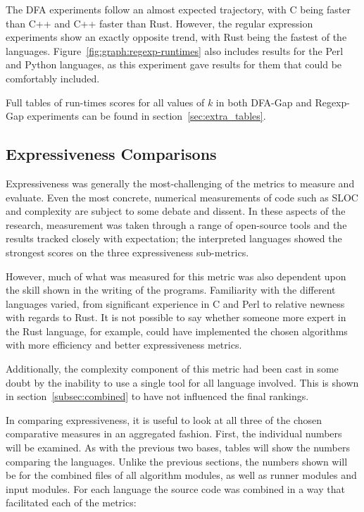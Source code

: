 The DFA experiments follow an almost expected trajectory, with C being faster than C++ and C++ faster than Rust. However, the regular expression experiments show an exactly opposite trend, with Rust being the fastest of the languages. Figure~\ref{fig:graph:regexp-runtimes} also includes results for the Perl and Python languages, as this experiment gave results for them that could be comfortably included.

Full tables of run-times scores for all values of $k$ in both DFA-Gap and Regexp-Gap experiments can be found in section~\ref{sec:extra_tables}.

\subsection{Expressiveness Comparisons}
\label{subsec:expr_comp}

Expressiveness was generally the most-challenging of the metrics to measure and evaluate. Even the most concrete, numerical measurements of code such as SLOC and complexity are subject to some debate and dissent. In these aspects of the research, measurement was taken through a range of open-source tools and the results tracked closely with expectation; the interpreted languages showed the strongest scores on the three expressiveness sub-metrics.

However, much of what was measured for this metric was also dependent upon the skill shown in the writing of the programs. Familiarity with the different languages varied, from significant experience in C and Perl to relative newness with regards to Rust. It is not possible to say whether someone more expert in the Rust language, for example, could have implemented the chosen algorithms with more efficiency and better expressiveness metrics.

Additionally, the complexity component of this metric had been cast in some doubt by the inability to use a single tool for all language involved. This is shown in section~\ref{subsec:combined} to have not influenced the final rankings.

In comparing expressiveness, it is useful to look at all three of the chosen comparative measures in an aggregated fashion. First, the individual numbers will be examined. As with the previous two bases, tables will show the numbers comparing the languages. Unlike the previous sections, the numbers shown will be for the combined files of all algorithm modules, as well as runner modules and input modules. For each language the source code was combined in a way that facilitated each of the metrics:

